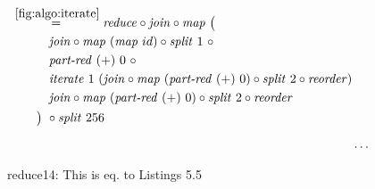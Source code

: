 \begin{figure*}[t]
\begin{align*}
\begin{aligned}
    &\overset{\ref{fig:algo:iterate}}{=\hspace{.2em}}
      \reduce \circ \join \circ \map\ \big(\\
    &\qquad\quad\join \circ \map\ (\map\ id) \circ \splitN\ 1\ \circ\\
    &\qquad\quad\partRed\ (+)\ 0\ \circ\\
    &\qquad\quad\iterateN\ 1\ (\join \circ \map\ (\partRed\ (+)\ 0) \circ \splitN\ 2\circ \reorder)\\
    &\qquad\quad\join \circ \map\ (\partRed\ (+)\ 0) \circ \splitN\ 2\circ \reorder\\
    &\qquad\big)\ \circ \splitN\ 256
  \end{aligned}\\[.5em]
%
  &\ldots
\end{align*}
\caption{reduce14: This is eq. to Listings 5.5}
\end{figure*}

